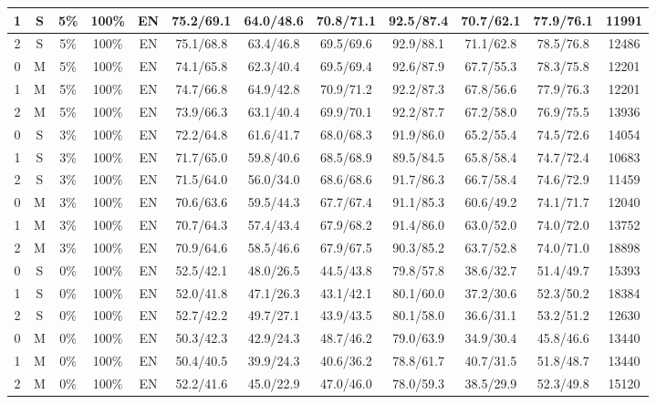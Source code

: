 \begin{table*}
{\begin{tabular}{|c|c|c|c|c||c|c|c|c|c|c||c|}
1 & S & 5\% & 100\% & EN & 75.2/69.1 & 64.0/48.6 & 70.8/71.1 & 92.5/87.4 & 70.7/62.1 & 77.9/76.1 & 11991 \\ \hline
2 & S & 5\% & 100\% & EN & 75.1/68.8 & 63.4/46.8 & 69.5/69.6 & 92.9/88.1 & 71.1/62.8 & 78.5/76.8 & 12486 \\ \hline
0 & M & 5\% & 100\% & EN & 74.1/65.8 & 62.3/40.4 & 69.5/69.4 & 92.6/87.9 & 67.7/55.3 & 78.3/75.8 & 12201 \\ \hline
1 & M & 5\% & 100\% & EN & 74.7/66.8 & 64.9/42.8 & 70.9/71.2 & 92.2/87.3 & 67.8/56.6 & 77.9/76.3 & 12201 \\ \hline
2 & M & 5\% & 100\% & EN & 73.9/66.3 & 63.1/40.4 & 69.9/70.1 & 92.2/87.7 & 67.2/58.0 & 76.9/75.5 & 13936 \\ \hline
0 & S & 3\% & 100\% & EN & 72.2/64.8 & 61.6/41.7 & 68.0/68.3 & 91.9/86.0 & 65.2/55.4 & 74.5/72.6 & 14054 \\ \hline
1 & S & 3\% & 100\% & EN & 71.7/65.0 & 59.8/40.6 & 68.5/68.9 & 89.5/84.5 & 65.8/58.4 & 74.7/72.4 & 10683 \\ \hline
2 & S & 3\% & 100\% & EN & 71.5/64.0 & 56.0/34.0 & 68.6/68.6 & 91.7/86.3 & 66.7/58.4 & 74.6/72.9 & 11459 \\ \hline
0 & M & 3\% & 100\% & EN & 70.6/63.6 & 59.5/44.3 & 67.7/67.4 & 91.1/85.3 & 60.6/49.2 & 74.1/71.7 & 12040 \\ \hline
1 & M & 3\% & 100\% & EN & 70.7/64.3 & 57.4/43.4 & 67.9/68.2 & 91.4/86.0 & 63.0/52.0 & 74.0/72.0 & 13752 \\ \hline
2 & M & 3\% & 100\% & EN & 70.9/64.6 & 58.5/46.6 & 67.9/67.5 & 90.3/85.2 & 63.7/52.8 & 74.0/71.0 & 18898 \\ \hline
0 & S & 0\% & 100\% & EN & 52.5/42.1 & 48.0/26.5 & 44.5/43.8 & 79.8/57.8 & 38.6/32.7 & 51.4/49.7 & 15393 \\ \hline
1 & S & 0\% & 100\% & EN & 52.0/41.8 & 47.1/26.3 & 43.1/42.1 & 80.1/60.0 & 37.2/30.6 & 52.3/50.2 & 18384 \\ \hline
2 & S & 0\% & 100\% & EN & 52.7/42.2 & 49.7/27.1 & 43.9/43.5 & 80.1/58.0 & 36.6/31.1 & 53.2/51.2 & 12630 \\ \hline
0 & M & 0\% & 100\% & EN & 50.3/42.3 & 42.9/24.3 & 48.7/46.2 & 79.0/63.9 & 34.9/30.4 & 45.8/46.6 & 13440 \\ \hline
1 & M & 0\% & 100\% & EN & 50.4/40.5 & 39.9/24.3 & 40.6/36.2 & 78.8/61.7 & 40.7/31.5 & 51.8/48.7 & 13440 \\ \hline
2 & M & 0\% & 100\% & EN & 52.2/41.6 & 45.0/22.9 & 47.0/46.0 & 78.0/59.3 & 38.5/29.9 & 52.3/49.8 & 15120 \\ \hline
\end{tabular}}
\end{table*}


